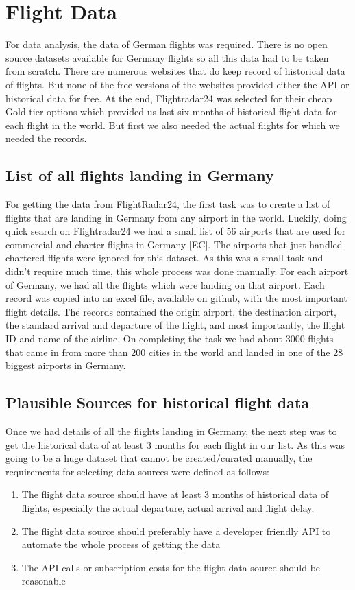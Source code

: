 \chapter{Flight Data}
For data analysis, the data of German flights was required. There is no open source datasets available for Germany flights so all this data had to be taken from scratch. There are numerous websites that do keep record of historical data of flights. But none of the free versions of the websites provided either the API or historical data for free. At the end, Flightradar24 was selected for their cheap Gold tier options which provided us last six months of historical flight data for each flight in the world. But first we also needed the actual flights for which we needed the records.

\section{List of all flights landing in Germany}
For getting the data from FlightRadar24, the first task was to create a list of flights that are landing in Germany from any airport in the world. Luckily, doing quick search on Flightradar24 we had a small list of 56 airports that are used for commercial and charter flights in Germany [EC]. The airports that just handled chartered flights were ignored for this dataset. As this was a small task and didn't require much time, this whole process was done manually. For each airport of Germany, we had all the flights which were landing on that airport. Each record was copied into an excel file, available on github, with the most important flight details. The records contained the origin airport, the destination airport, the standard arrival and departure of the flight, and most importantly, the flight ID and name of the airline. On completing the task we had about 3000 flights that came in from more than 200 cities in the world and landed in one of the 28 biggest airports in Germany.

\section{Plausible Sources for historical flight data}
Once we had details of all the flights landing in Germany, the next step was to get the historical data of at least 3 months for each flight in our list. As this was going to be a huge dataset that cannot be created/curated manually, the requirements for selecting data sources were defined as follows:
\begin{enumerate}
    \item The flight data source should have at least 3 months of historical data of flights, especially the actual departure, actual arrival and flight delay.
    \item The flight data source should preferably have a developer friendly API to automate the whole process of getting the data
    \item The API calls or subscription costs for the flight data source should be reasonable
\end{enumerate}

